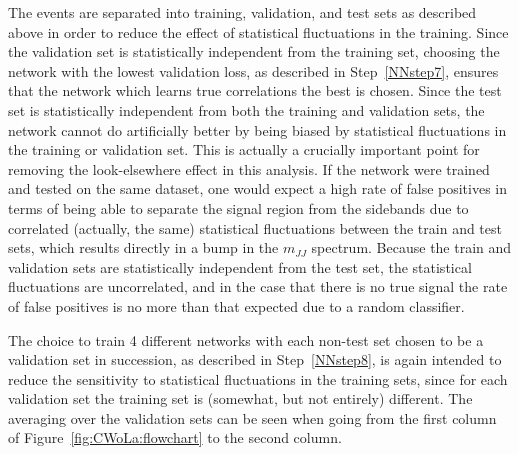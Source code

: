 The events are separated into training, validation, and test sets as described above in order to reduce the effect of statistical fluctuations in the training.
Since the validation set is statistically independent from the training set, choosing the network with the lowest validation loss, as described in Step~\ref{NNstep7}, ensures that the network which learns true correlations the best is chosen.
Since the test set is statistically independent from both the training and validation sets, the network cannot do artificially better by being biased by statistical fluctuations in the training or validation set.
This is actually a crucially important point for removing the look-elsewhere effect in this analysis.
If the network were trained and tested on the same dataset, one would expect a high rate of false positives in terms of being able to separate the signal region from the sidebands due to correlated (actually, the same) statistical fluctuations between the train and test sets, which results directly in a bump in the $m_{JJ}$ spectrum.
Because the train and validation sets are statistically independent from the test set, the statistical fluctuations are uncorrelated, and in the case that there is no true signal the rate of false positives is no more than that expected due to a random classifier. 

The choice to train 4 different networks with each non-test set chosen to be a validation set in succession, as described in Step~\ref{NNstep8}, is again intended to reduce the sensitivity to statistical fluctuations in the training sets, since for each validation set the training set is (somewhat, but not entirely) different.
The averaging over the validation sets can be seen when going from the first column of Figure~\ref{fig:CWoLa:flowchart} to the second column.

